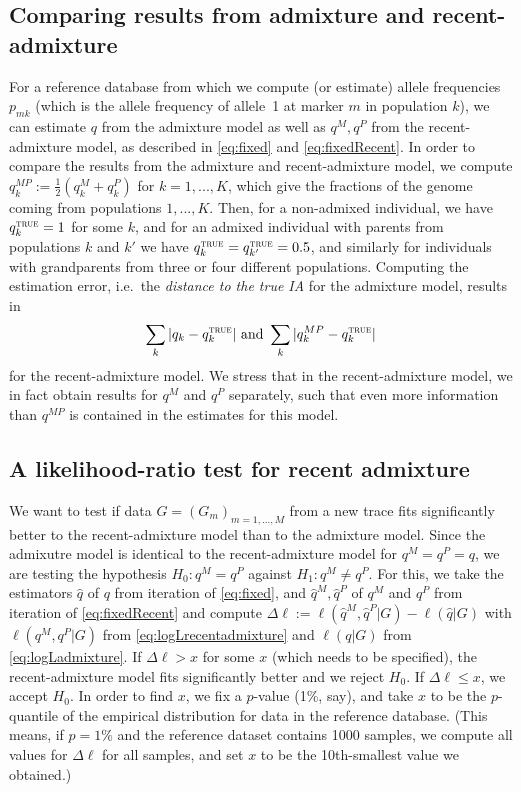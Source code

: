 \documentclass[12pt]{article}
\theoremstyle{definition}
\begin{document}
\subsection{Comparing results from admixture and recent-admixture}
For a reference database from which we compute (or estimate) allele
frequencies $p_{mk}$ (which is the allele frequency of allele~1 at
marker $m$ in population $k$), we can estimate $q$ from the admixture
model as well as $q^M,q^P$ from the recent-admixture model, as
described in \eqref{eq:fixed} and \eqref{eq:fixedRecent}. In order to
compare the results from the admixture and recent-admixture model, we
compute $q_k^{MP} := \tfrac 12 (q_k^M + q_k^P)$ for $k=1,...,K$, which
give the fractions of the genome coming from populations
$1,...,K$. Then, for a non-admixed individual, we have
$q_k^{\text{\sc true}} = 1$ for some $k$, and for an admixed
individual with parents from populations $k$ and $k'$ we have
$q_k^{\text{\sc true}} =q_{k'}^{\text{\sc true}} = 0.5$, and similarly
for individuals with grandparents from three or four different
populations. Computing the estimation error, i.e.\ the {\em distance
  to the true IA} for the admixture model, results in
\begin{align}
  \label{eq:error}
  \sum_k |q_k - q_k^{\text{\sc true}}| \text{  and }\sum_k |q_k^{MP} - q_k^{\text{\sc true}}|
\end{align}
for the recent-admixture model. We stress that in the recent-admixture
model, we in fact obtain results for $q^M$ and $q^P$ separately, such
that even more information than $q^{MP}$ is contained in the estimates
for this model.

\subsection{A likelihood-ratio test for recent admixture}
We want to test if data $G = (G_m)_{m=1,...,M}$ from a new trace fits
significantly better to the recent-admixture model than to the
admixture model. Since the admixutre model is identical to the
recent-admixture model for $q^M = q^P = q$, we are testing the
hypothesis $H_0: q^M = q^P$ against $H_1: q^M\neq q^P$. For this, we
take the estimators $\hat q$ of $q$ from iteration of
\eqref{eq:fixed}, and $\hat q^M, \hat q^P$ of $q^M$ and $q^P$ from
iteration of \eqref{eq:fixedRecent} and compute
$\Delta\ell := \ell(\hat q^M, \hat q^P|G) - \ell(\hat q|G)$ with
$\ell(q^M, q^P|G)$ from \eqref{eq:logLrecentadmixture} and $\ell(q|G)$
from \eqref{eq:logLadmixture}. If $\Delta \ell >x$ for some $x$ (which
needs to be specified), the recent-admixture model fits significantly
better and we reject $H_0$. If $\Delta \ell \leq x$, we accept
$H_0$. In order to find $x$, we fix a $p$-value (1\%, say), and take
$x$ to be the $p$-quantile of the empirical distribution for data in
the reference database. (This means, if $p=1\%$ and the reference
dataset contains 1000 samples, we compute all values for $\Delta\ell$
for all samples, and set $x$ to be the 10th-smallest value we
obtained.)
\end{document}
